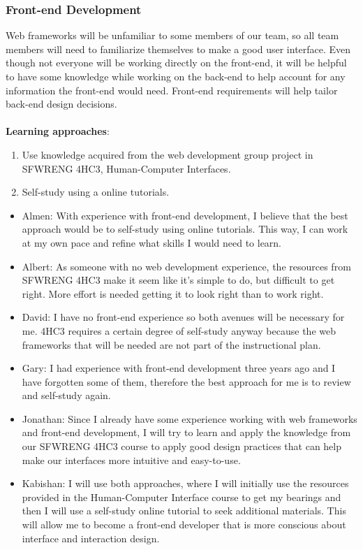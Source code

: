 \documentclass[12pt,letterpaper]{article}
\begin{document}
\subsubsection{Front-end Development}
Web frameworks will be unfamiliar to some members of our team, so all team
members will need to familiarize themselves to make a good user interface. Even
though not everyone will be working directly on the front-end, it will be
helpful to have some knowledge while working on the back-end to help account for
any information the front-end would need. Front-end requirements will help
tailor back-end design decisions. \\
\\
\noindent \textbf{Learning approaches}:
\begin{enumerate}
    \item Use knowledge acquired from the web development group project in
    SFWRENG 4HC3, Human-Computer Interfaces.
    \item Self-study using a online tutorials.
\end{enumerate}

\begin{itemize}
    \item Almen: With experience with front-end development, I believe that the
    best approach would be to self-study using online tutorials. This way, I can
    work at my own pace and refine what skills I would need to learn.
    \item Albert: As someone with no web development experience, the resources
    from SFWRENG 4HC3 make it seem like it's simple to do, but difficult to get
    right. More effort is needed getting it to look right than to work right. 
    \item David: I have no front-end experience so both avenues will be
    necessary for me. 4HC3 requires a certain degree of self-study anyway
    because the web frameworks that will be needed are not part of the
    instructional plan.
    \item Gary: I had experience with front-end development three years ago and
    I have forgotten some of them, therefore the best approach for me is to
    review and self-study again.
    \item Jonathan: Since I already have some experience working with web
    frameworks and front-end development, I will try to learn and apply the
    knowledge from our SFWRENG 4HC3 course to apply good design practices that
    can help make our interfaces more intuitive and easy-to-use.
    \item Kabishan: I will use both approaches, where I will initially use the
    resources provided in the Human-Computer Interface course to get my bearings
    and then I will use a self-study online tutorial to seek additional
    materials. This will allow me to become a front-end developer that is more
    conscious about interface and interaction design.
\end{itemize}
\end{document}
